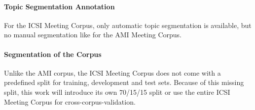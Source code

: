 \paragraph{Topic Segmentation Annotation}

For the ICSI Meeting Corpus, only automatic topic segmentation is available, but no manual segmentation like for the AMI Meeting Corpus.

\paragraph{Segmentation of the Corpus}

Unlike the AMI corpus, the ICSI Meeting Corpus does not come with a predefined split for training, development and test sets.
Because of this missing split, this work will introduce its own 70/15/15 split or use the entire ICSI Meeting Corpus for cross-corpus-validation.